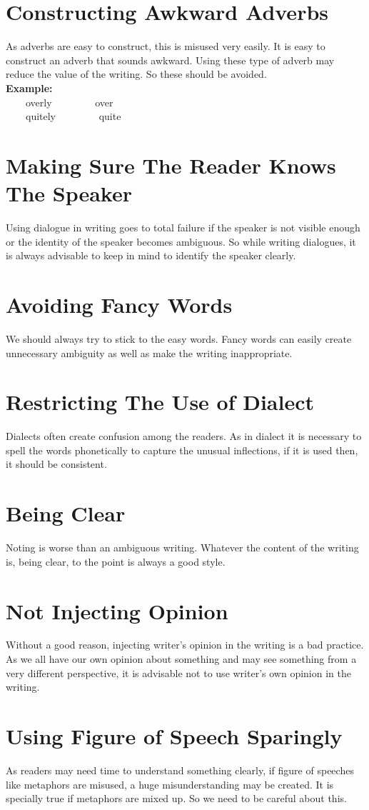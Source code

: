 \documentclass{report}
\newcommand{\xmpl}{\textbf{Example:}\\} %
\newcommand{\indnt}{\ \ \ \ } %
\begin{document}
\section{Constructing Awkward Adverbs}
As adverbs are easy to construct, this is misused very easily. It is easy to construct an adverb that sounds awkward. Using these type of adverb may reduce the value of the writing. So these should be avoided.\\
\xmpl
\indnt overly \indnt \indnt over\\
\indnt quitely \indnt \indnt quite\\
\section{Making Sure The Reader Knows The Speaker}
Using dialogue in writing goes to total failure if the speaker is not visible enough or the identity of the speaker becomes ambiguous.
So while writing dialogues, it is always advisable to keep in mind to identify the speaker clearly.
\section{Avoiding Fancy Words}
We should always try to stick to the easy words. Fancy words can easily create unnecessary ambiguity as well as make the writing inappropriate.
\section{Restricting The Use of Dialect}
Dialects often create confusion among the readers. As in dialect it is necessary to spell the words phonetically to capture the unusual inflections, if it is used then, it should be consistent.
\section{Being Clear}
Noting is worse than an ambiguous writing. Whatever the content of the writing is, being clear, to the point is always a good style.
\section{Not Injecting Opinion}
Without a good reason, injecting writer's opinion in the writing is a bad practice. As we all have our own opinion about something and may see something from a very different perspective, it is advisable not to use writer's own opinion in the writing.
\section{Using Figure of Speech Sparingly}
As readers may need time to understand something clearly, if figure of speeches like metaphors are misused, a huge misunderstanding may be created. It is specially true if metaphors are mixed up. So we need to be careful about this.
\end{document}
